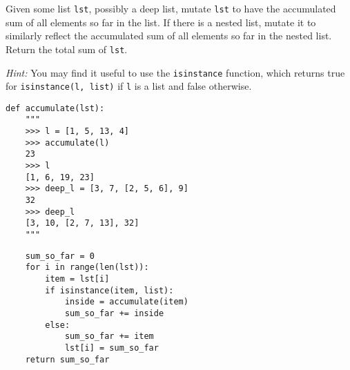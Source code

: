 \begin{blocksection}
\question Given some list \texttt{lst}, possibly a deep list, mutate \texttt{lst} to have the accumulated sum of all elements so far in the list. If there is a nested list, mutate it to similarly reflect the accumulated sum of all elements so far in the nested list. Return the total sum of \texttt{lst}.

\emph{Hint:} You may find it useful to use the \lstinline$isinstance$ function, which returns true for \lstinline$isinstance(l, list)$ if \texttt{l} is a list and false otherwise.

\begin{lstlisting}
def accumulate(lst):
    """
    >>> l = [1, 5, 13, 4]
    >>> accumulate(l)
    23
    >>> l
    [1, 6, 19, 23]
    >>> deep_l = [3, 7, [2, 5, 6], 9]
    32
    >>> deep_l
    [3, 10, [2, 7, 13], 32]
    """
\end{lstlisting}

\begin{solution}[2in]
\begin{lstlisting}
    sum_so_far = 0
    for i in range(len(lst)):
        item = lst[i]
        if isinstance(item, list):
            inside = accumulate(item)
            sum_so_far += inside
        else:
            sum_so_far += item
            lst[i] = sum_so_far
    return sum_so_far
\end{lstlisting}
\end{solution}
\end{blocksection}
